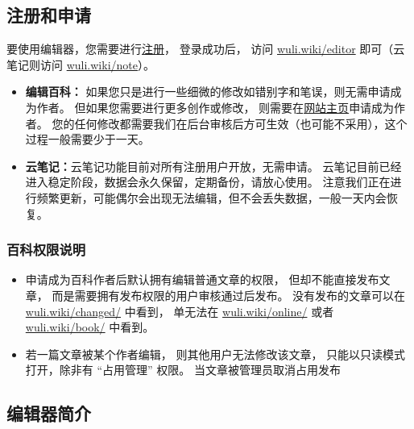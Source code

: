 \subsection{注册和申请}
要使用编辑器，您需要进行\href{https://wuli.wiki/forum}{注册}， 登录成功后， 访问 \href{https://wuli.wiki/editor/}{wuli.wiki/editor} 即可（云笔记则访问 \href{https://wuli.wiki/note/}{wuli.wiki/note}）。
\begin{itemize}
\item \textbf{编辑百科：} 如果您只是进行一些细微的修改如错别字和笔误，则无需申请成为作者。 但如果您需要进行更多创作或修改， 则需要在\href{https://wuli.wiki}{网站主页}申请成为作者。 您的任何修改都需要我们在后台审核后方可生效（也可能不采用），这个过程一般需要少于一天。
\item \textbf{云笔记：}云笔记功能目前对所有注册用户开放，无需申请。 云笔记目前已经进入稳定阶段，数据会永久保留，定期备份，请放心使用。 注意我们正在进行频繁更新，可能偶尔会出现无法编辑，但不会丢失数据，一般一天内会恢复。
\end{itemize}

\subsubsection{百科权限说明}
\begin{itemize}
\item 申请成为百科作者后默认拥有编辑普通文章的权限， 但却不能直接发布文章， 而是需要拥有发布权限的用户审核通过后发布。 没有发布的文章可以在 \href{http://wuli.wiki/changed/}{wuli.wiki/changed/} 中看到， 单无法在 \href{http://wuli.wiki/changed/}{wuli.wiki/online/} 或者 \href{http://wuli.wiki/book/}{wuli.wiki/book/} 中看到。
\item 若一篇文章被某个作者编辑， 则其他用户无法修改该文章， 只能以只读模式打开，除非有 “占用管理” 权限。 当文章被管理员取消占用发布
\end{itemize}

\subsection{编辑器简介}


